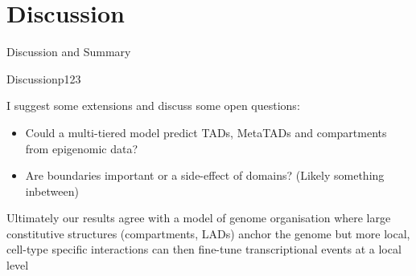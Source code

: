 \documentclass{beamer}
\begin{document}
\section{Discussion}

{
\begin{frame}{}
\begin{tcolorbox}[colback=blue!40!black,colframe=blue!40!black]
\begin{center}
{
Discussion and Summary }
\end{center}
\end{tcolorbox}
\end{frame}
}

\begin{frame}{Discussion}{p123}

I suggest some extensions and discuss some open questions:
\begin{itemize}
\item Could a multi-tiered model predict TADs, MetaTADs and compartments from epigenomic data?
\item Are boundaries important or a side-effect of domains? (Likely something inbetween)
\end{itemize} 

\vspace{2em}

Ultimately our results agree with a model of genome organisation where large constitutive structures (compartments, LADs) anchor the genome but more local, cell-type specific interactions can then fine-tune transcriptional events at a local level

\end{frame}
%
\end{document}
